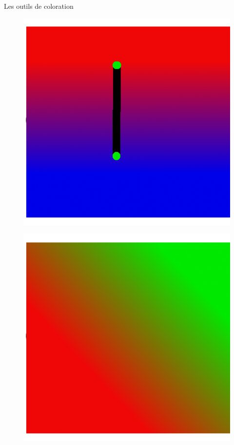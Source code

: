 \begin{frame}{Les outils de coloration}
\begin{overprint}
\begin{enumerate}
{				\begin{minipage}{0.45\textwidth}
				\begin{figure}
				    	\centering
				    	\includegraphics[width=\textwidth]{Images/degrade_ex.png}
				\end{figure}
				\end{minipage}\hfill
				\begin{minipage}{0.45\textwidth}
				\begin{figure}
				    	\centering
				    	\includegraphics[width=\textwidth]{Images/degrade_ex2.png}
				\end{figure}
				\end{minipage}


}
\end{enumerate}
\end{overprint}
\end{frame}
